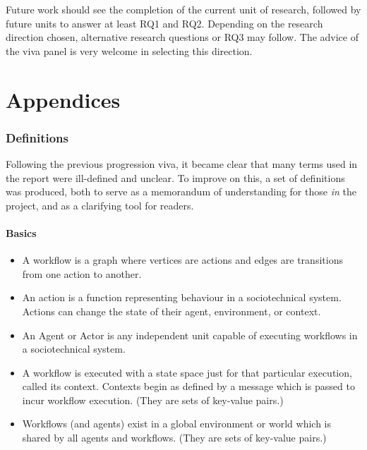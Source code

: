 \documentclass[11pt]{article}
\begin{document}
Future work should see the completion of the current unit of research, followed
by future units to answer at least RQ1 and RQ2. Depending on the research
direction chosen, alternative research questions or RQ3 may follow. The advice
of the viva panel is very welcome in selecting this direction.



\newpage
{}





\newpage
\part{Appendices}
\appendix
\label{part:appendices}

\section{Definitions}
\label{sec:org6d3213d}
\label{app:definitions}


Following the previous progression viva, it became clear that many terms used in
the report were ill-defined and unclear. To improve on this, a set of
definitions was produced, both to serve as a memorandum of understanding for
those \emph{in} the project, and as a clarifying tool for readers.

\subsection{Basics}
\label{sec:org2520578}

\begin{itemize}
\item A workflow is a graph where vertices are actions and edges are transitions from one action to another.
\item An action is a function representing behaviour in a sociotechnical system. Actions can change the state of their agent, environment, or context.
\item An Agent or Actor is any independent unit capable of executing workflows in a sociotechnical system.
\item A workflow is executed with a state space just for that particular execution, called its context. Contexts begin as defined by a message which is passed to incur workflow execution. (They are sets of key-value pairs.)
\item Workflows (and agents) exist in a global environment or world which is shared by all agents and workflows. (They are sets of key-value pairs.)
\end{itemize}
\end{document}
